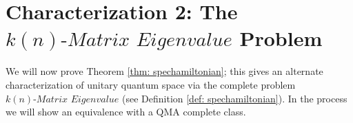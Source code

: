 \documentclass[11pt]{article}
\theoremstyle{definition}
\newtheorem{definition}[theorem]{Definition}
\theoremstyle{remark}
\newcommand\QMAexp{{\sf{PreciseQMA}}}
\newcommand\spechamiltonian[1]{#1\textit{-Matrix Eigenvalue}}
\newcommand{\classfont}{\sf}
\newcommand{\Unitary}{\mathbf{U}}
\newcommand{\unitaryBQSPACE}[1]{{\classfont{BQ}_\Unitary\classfont{SPACE}}[#1]}
\newcommand\bigoh{\mathcal{O}}
\begin{document}
\section{Characterization 2: The $\spechamiltonian{k(n)}$ Problem}
We will now prove Theorem \ref{thm: spechamiltonian}; this gives an alternate characterization of unitary quantum space via the complete problem $\spechamiltonian{k(n)}$ (see Definition \ref{def: spechamiltonian}). In the process we will show an equivalence with a QMA complete class.
\end{document}
